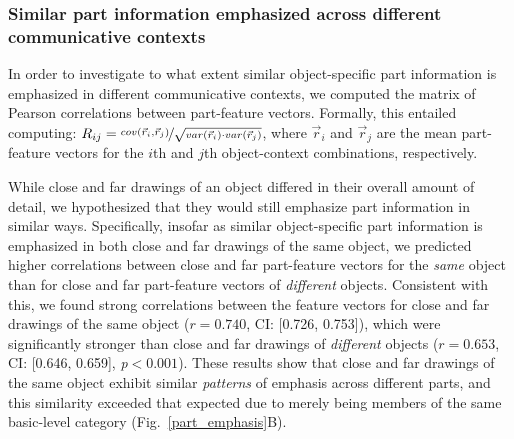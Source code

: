 \documentclass[10pt,letterpaper]{article}
\begin{document}
\subsubsection{Similar part information emphasized across different communicative contexts}

In order to investigate to what extent similar object-specific part information is emphasized in different communicative contexts, we computed the matrix of Pearson correlations between part-feature vectors. 
Formally, this entailed computing: $R_{ij} =  \nicefrac{cov(\vec{r}_{i}, \vec{r}_{j})}{\sqrt{var(\vec{r}_{i}) \cdot var(\vec{r}_{j})}}$, where $\vec{r}_{i}$ and $\vec{r}_{j}$ are the mean part-feature vectors for the $i$th and $j$th object-context combinations, respectively.

While close and far drawings of an object differed in their overall amount of detail, we hypothesized that they would still emphasize part information in similar ways.
Specifically, insofar as similar object-specific part information is emphasized in both close and far drawings of the same object, we predicted higher correlations between close and far part-feature vectors for the \textit{same} object than for close and far part-feature vectors of \textit{different} objects. 
Consistent with this, we found strong correlations between the feature vectors for close and far drawings of the same object ($r = 0.740$,  CI: [0.726, 0.753]), which were significantly stronger than close and far drawings of \emph{different} objects ($r = 0.653$, CI: [0.646, 0.659], \textit{p}$<0.001$).
These results show that close and far drawings of the same object exhibit similar \emph{patterns} of emphasis across different parts, and this similarity exceeded that expected due to merely being members of the same basic-level category (Fig.~\ref{part_emphasis}B). 



\end{document}
